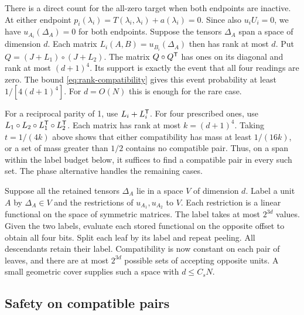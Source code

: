 There is a direct count for the all-zero target when both endpoints are
inactive. At either endpoint \(p_i(\lambda_i)=T(\lambda_i,\lambda_i)
+a(\lambda_i)=0\). Since also \(u_iU_i=0\), we have \(u_{A_i}(\Delta_A)=0\) for both endpoints. Suppose the tensors \(\Delta_A\) span a space of dimension
\(d\). Each matrix \(L_i(A,B)=u_{B_i}(\Delta_A)\) then has rank at
most \(d\). Put \(Q=(J+L_1)\circ(J+L_2)\). The matrix
\(Q\circ Q^{\mathsf T}\) has ones on its diagonal and rank at most
\((d+1)^4\). Its support is exactly the event that all four readings
are zero. The bound \eqref{eq:rank-compatibility} gives this event probability at least
\(1/[4(d+1)^4]\). For \(d=O(N)\) this is enough for the rare case.

For a reciprocal parity of 1, use \(L_i+L_i^{\mathsf T}\). For four
prescribed ones, use \(L_1\circ L_2\circ L_1^{\mathsf T}\circ L_2^{\mathsf T}\).
Each matrix has rank at most \(k=(d+1)^4\). Taking \(t=1/(4k)\) above
shows that either compatibility has mass at least \(1/(16k)\), or a
set of mass greater than \(1/2\) contains no compatible pair. Thus, on
a span within the label budget below, it suffices to find a compatible
pair in every such set. The phase alternative handles the remaining cases.

Suppose all the retained tensors \(\Delta_A\) lie in a space \(V\)
of dimension \(d\).
Label a unit \(A\) by \(\Delta_A\in V\) and the restrictions of
\(u_{A_1},u_{A_2}\) to \(V\). Each restriction is a linear functional
on the space of symmetric matrices. The label takes at most \(2^{3d}\)
values. Given the two labels, evaluate each stored functional on
the opposite offset to obtain all four bits. Split each leaf
by its label and repeat peeling. All descendants retain their label.
Compatibility is now constant on each pair of leaves, and there are at
most \(2^{3d}\) possible sets of accepting opposite units. A small
geometric cover supplies such a space with \(d\le C_sN\).

\subsection{Safety on compatible pairs}

